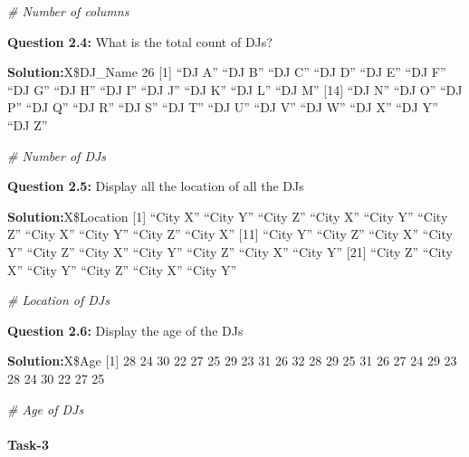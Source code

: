 \documentclass[
]{article}
\newenvironment{Shaded}{\begin{snugshade}}{\end{snugshade}}
\newcommand{\CommentTok}[1]{\textcolor[rgb]{0.56,0.35,0.01}{\textit{#1}}}
\begin{document}
\begin{Shaded}
\begin{Highlighting}[]
\CommentTok{\# Number of columns}
\end{Highlighting}
\end{Shaded}

\textbf{Question 2.4:} What is the total count of DJs?

\textbf{Solution:}X\$DJ\_Name 26 {[}1{]} ``DJ A'' ``DJ B'' ``DJ C'' ``DJ
D'' ``DJ E'' ``DJ F'' ``DJ G'' ``DJ H'' ``DJ I'' ``DJ J'' ``DJ K'' ``DJ
L'' ``DJ M'' {[}14{]} ``DJ N'' ``DJ O'' ``DJ P'' ``DJ Q'' ``DJ R'' ``DJ
S'' ``DJ T'' ``DJ U'' ``DJ V'' ``DJ W'' ``DJ X'' ``DJ Y'' ``DJ Z''

\begin{Shaded}
\begin{Highlighting}[]
\CommentTok{\# Number of DJs}
\end{Highlighting}
\end{Shaded}

\textbf{Question 2.5:} Display all the location of all the DJs

\textbf{Solution:}X\$Location {[}1{]} ``City X'' ``City Y'' ``City Z''
``City X'' ``City Y'' ``City Z'' ``City X'' ``City Y'' ``City Z'' ``City
X'' {[}11{]} ``City Y'' ``City Z'' ``City X'' ``City Y'' ``City Z''
``City X'' ``City Y'' ``City Z'' ``City X'' ``City Y'' {[}21{]} ``City
Z'' ``City X'' ``City Y'' ``City Z'' ``City X'' ``City Y''

\begin{Shaded}
\begin{Highlighting}[]
\CommentTok{\# Location of DJs}
\end{Highlighting}
\end{Shaded}

\textbf{Question 2.6:} Display the age of the DJs

\textbf{Solution:}X\$Age {[}1{]} 28 24 30 22 27 25 29 23 31 26 32 28 29
25 31 26 27 24 29 23 28 24 30 22 27 25

\begin{Shaded}
\begin{Highlighting}[]
\CommentTok{\# Age of DJs}
\end{Highlighting}
\end{Shaded}

\hypertarget{task-3}{%
\paragraph{Task-3}\label{task-3}}
\end{document}
